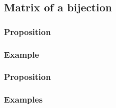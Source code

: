 \documentclass[notitlepage]{math}
\begin{document}
\subsection{Matrix of a bijection}
\subsubsection{Proposition}
\subsubsection{Example}
\subsubsection{Proposition}
\subsubsection{Examples}
\end{document}
